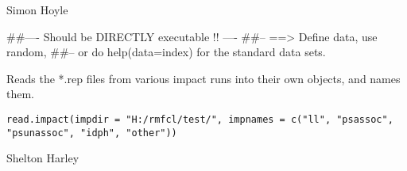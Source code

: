 \documentclass[a4paper]{book}
\begin{document}
%
\begin{Arguments}
\begin{ldescription}
\item[\code{frq.file}] 


\item[\code{frq.title}] 


\item[\code{ntop}] 


\item[\code{fishdefs}] 


\end{ldescription}
\end{Arguments}
%
\begin{Author}\relax

Simon Hoyle
\end{Author}
%
\begin{Examples}
\begin{ExampleCode}
##---- Should be DIRECTLY executable !! ----
##-- ==>  Define data, use random,
##--	or do  help(data=index)  for the standard data sets.

\end{ExampleCode}
\end{Examples}
%
\begin{Description}\relax

Reads the *.rep files from various impact runs into their own objects, and names them. 
\end{Description}
%
\begin{Usage}
\begin{verbatim}
read.impact(impdir = "H:/rmfcl/test/", impnames = c("ll", "psassoc", "psunassoc", "idph", "other"))
\end{verbatim}
\end{Usage}
%
\begin{Arguments}
\begin{ldescription}
\item[\code{impdir}] 


\item[\code{impnames}] 


\end{ldescription}
\end{Arguments}
%
\begin{Author}\relax

Shelton Harley
\end{Author}
\end{document}

